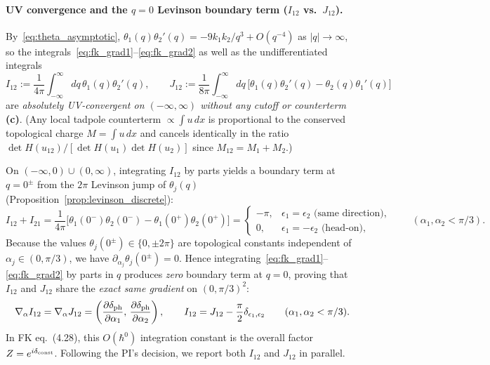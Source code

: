 \documentclass[11pt,a4paper]{article}
\newcommand{\Lc}{\textsf{\textbf{(c)}}}
\theoremstyle{remark}
\begin{document}
\paragraph{UV convergence and the $q=0$ Levinson boundary term ($I_{12}$ vs.\ $J_{12}$).}
By~\eqref{eq:theta_asymptotic}, $\theta_1(q)\theta_2'(q)=-9k_1 k_2/q^3+O(q^{-4})$ as $|q|\to\infty$, so the integrals~\eqref{eq:fk_grad1}--\eqref{eq:fk_grad2} as well as the undifferentiated integrals
\begin{equation}\label{eq:I12_J12_defs}
I_{12}:=\frac{1}{4\pi}\int_{-\infty}^\infty dq\,\theta_1(q)\theta_2'(q),\qquad
J_{12}:=\frac{1}{8\pi}\int_{-\infty}^\infty dq\,\big[\theta_1(q)\theta_2'(q)-\theta_2(q)\theta_1'(q)\big]
\end{equation}
are \emph{absolutely UV-convergent on $(-\infty,\infty)$ without any cutoff or counterterm} \Lc. (Any local tadpole counterterm $\propto\int u\,dx$ is proportional to the conserved topological charge $M=\int u\,dx$ and cancels identically in the ratio $\det H(u_{12})/[\det H(u_1)\det H(u_2)]$ since $M_{12}=M_1+M_2$.)

On $(-\infty,0)\cup(0,\infty)$, integrating $I_{12}$ by parts yields a boundary term at $q=0^\pm$ from the $2\pi$ Levinson jump of $\theta_j(q)$ (Proposition~\ref{prop:levinson_discrete}):
\begin{equation}\label{eq:I12_ibp}
I_{12}+I_{21}=\frac{1}{4\pi}\Big[\theta_1(0^-)\theta_2(0^-)-\theta_1(0^+)\theta_2(0^+)\Big]
=\begin{cases}-\pi,&\epsilon_1=\epsilon_2\text{ (same direction)},\\ 0,&\epsilon_1=-\epsilon_2\text{ (head-on)},\end{cases}
\qquad (\alpha_1,\alpha_2<\pi/3).
\end{equation}
Because the values $\theta_j(0^\pm)\in\{0,\pm 2\pi\}$ are topological constants independent of $\alpha_j\in(0,\pi/3)$, we have $\partial_{\alpha_j}\theta_j(0^\pm)=0$. Hence integrating~\eqref{eq:fk_grad1}--\eqref{eq:fk_grad2} by parts in $q$ produces \emph{zero} boundary term at $q=0$, proving that $I_{12}$ and $J_{12}$ share the \emph{exact same gradient} on $(0,\pi/3)^2$:
\begin{equation}\label{eq:grad_equality}
\nabla_{\alpha} I_{12}=\nabla_{\alpha} J_{12}=\left(\frac{\partial\delta_{\rm ph}}{\partial\alpha_1},\,\frac{\partial\delta_{\rm ph}}{\partial\alpha_2}\right),\qquad
I_{12}=J_{12}-\frac{\pi}{2}\delta_{\epsilon_1,\epsilon_2}\qquad (\alpha_1,\alpha_2<\pi/3).
\end{equation}
In FK eq.~(4.28), this $O(\hbar^0)$ integration constant is the overall factor $Z=e^{i\delta_{\rm const}}$. Following the PI's decision, we report both $I_{12}$ and $J_{12}$ in parallel.
\end{document}
